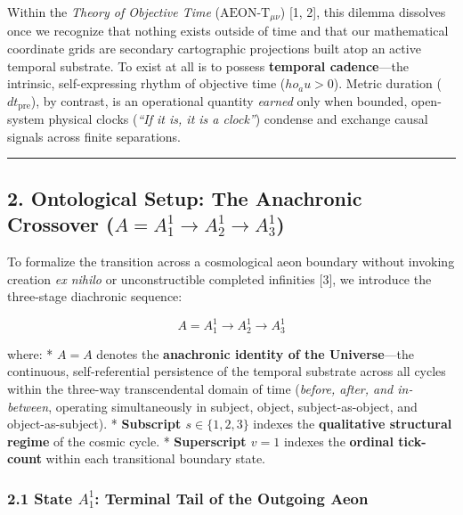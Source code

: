\documentclass[
]{article}
\begin{document}
Within the \emph{Theory of Objective Time} (\(\text{AEON-T}_{\mu\nu}\))
{[}1, 2{]}, this dilemma dissolves once we recognize that nothing exists
outside of time and that our mathematical coordinate grids are secondary
cartographic projections built atop an active temporal substrate. To
exist at all is to possess \textbf{temporal cadence}---the intrinsic,
self-expressing rhythm of objective time (\(ho_   au > 0\)). Metric
duration (\(dt_{\mathrm{pre}}\)), by contrast, is an operational
quantity \emph{earned} only when bounded, open-system physical clocks
(\emph{``If it is, it is a clock''}) condense and exchange causal
signals across finite separations.

\begin{center}\rule{0.5\linewidth}{0.5pt}\end{center}

\subsection{\texorpdfstring{2. Ontological Setup: The Anachronic
Crossover
(\(A = A_1^1 \to A_2^1 \to A_3^1\))}{2. Ontological Setup: The Anachronic Crossover (A = A\_1\^{}1 \textbackslash to A\_2\^{}1 \textbackslash to A\_3\^{}1)}}\label{ontological-setup-the-anachronic-crossover-a-a_11-to-a_21-to-a_31}

To formalize the transition across a cosmological aeon boundary without
invoking creation \emph{ex nihilo} or unconstructible completed
infinities {[}3{]}, we introduce the three-stage diachronic sequence:

\[A = A_1^1 \longrightarrow A_2^1 \longrightarrow A_3^1\]

where: * \textbf{\(A = A\)} denotes the \textbf{anachronic identity of
the Universe}---the continuous, self-referential persistence of the
temporal substrate across all cycles within the three-way transcendental
domain of time (\emph{before, after, and in-between}, operating
simultaneously in subject, object, subject-as-object, and
object-as-subject). * \textbf{Subscript \(s \in \{1, 2, 3\}\)} indexes
the \textbf{qualitative structural regime} of the cosmic cycle. *
\textbf{Superscript \(v = 1\)} indexes the \textbf{ordinal tick-count}
within each transitional boundary state.

\subsubsection{\texorpdfstring{2.1 State \(A_1^1\): Terminal Tail of the
Outgoing
Aeon}{2.1 State A\_1\^{}1: Terminal Tail of the Outgoing Aeon}}\label{state-a_11-terminal-tail-of-the-outgoing-aeon}
\end{document}
